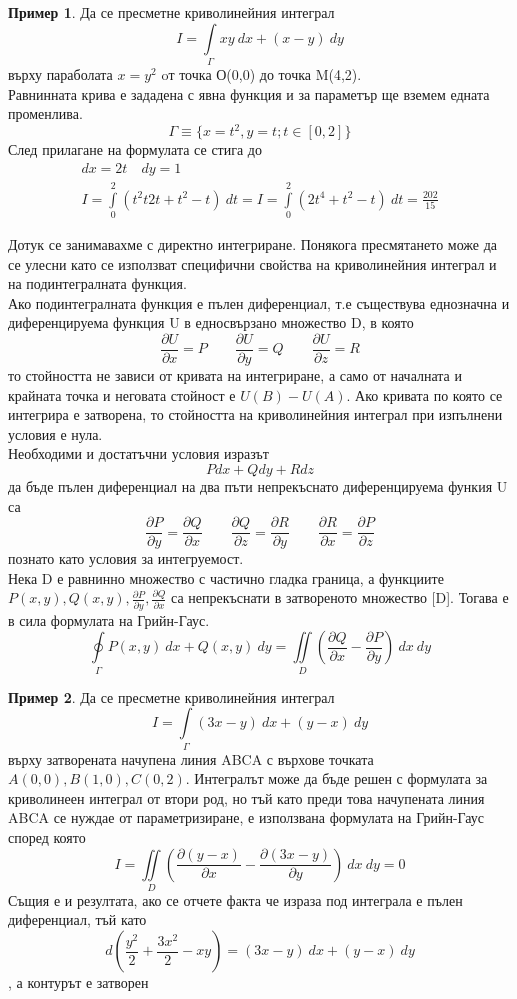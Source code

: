 \documentclass[a4paper,fleqn,12pt]{article}
\theoremstyle{definition}
\newtheorem{example}{Пример}[subsection]
\begin{document}
\begin{example}
Да се пресметне криволинейния интеграл 
$$I = \int\limits_{\Gamma} xy \ dx + (x-y) \ dy$$
върху параболата $x = y^2$ oт точка О(0,0) до точка M(4,2). \\
Равнинната крива е зададена с явна функция и за параметър ще вземем едната променлива. 
$$\Gamma \equiv \{ x = t^2, y=t; t \in [0,2]\}$$
След прилагане на формулата се стига до 
\begin{gather*}
dx = 2t \quad dy = 1\\
I = \int\limits_0 ^2 \left(t^2 t 2t + t^2 - t \right) \ dt = I = \int\limits_0 ^2 \left(2t^4 + t^2 - t \right) \ dt = \frac{202}{15}
\end{gather*}
\end{example}
Дотук се занимавахме с директно интегриране. 
Понякога пресмятането може да се улесни като се използват специфични свойства на криволинейния интеграл и на подинтегралната функция. \\
Ако подинтегралната функция е пълен диференциал, т.е съществува еднозначна и диференцируема функция U в едносвързано множество D, в която 
$$\frac{\partial U}{\partial x} = P \qquad \frac{\partial U}{\partial y} = Q \qquad \frac{\partial U}{\partial z} = R $$
то стойността не зависи от кривата на интегриране, а само от началната и крайната точка и неговата стойност е $U(B) - U(A)$.
Ако кривата по която се интегрира е затворена, то стойността на криволинейния интеграл при изпълнени условия е нула. \\
Необходими и достатъчни условия изразът
$$P dx + Q dy + R dz$$
да бъде пълен диференциал на два пъти непрекъснато диференцируема функия U са
$$\frac{\partial P}{\partial y} = \frac{\partial Q}{\partial x} \qquad 
\frac{\partial Q}{\partial z} = \frac{\partial R}{\partial y} \qquad 
\frac{\partial R}{\partial x} = \frac{\partial P}{\partial z}$$
познато като условия за интегруемост. \\
Нека D е равнинно множество с частично гладка граница, а функциите $P(x,y), Q(x,y), \frac{\partial P}{\partial y}, \frac{\partial Q}{\partial x}$ са непрекъснати в затвореното множество [D]. 
Тогава е в сила формулата на Грийн-Гаус.
$$\oint\limits_{\Gamma} P(x,y) \ dx + Q (x,y) \ dy = 
\iint\limits_{D} \left( \frac{\partial Q}{\partial x} - \frac{\partial P}{\partial y}\right) \ dx \ dy$$

\begin{example}
Да се пресметне криволинейния интеграл
$$I = \int\limits_{\Gamma} (3x- y) \ dx + (y-x) \ dy$$
върху затворената начупена линия ABCA с върхове точката $A(0,0), B(1,0), C(0,2)$. 
Интегралът може да бъде решен с формулата за криволинеен интеграл от втори род, но тъй като преди това начупената линия ABCA се нуждае от параметризиране, е използвана формулата на Грийн-Гаус според която 
$$I = \iint\limits_{D}  \left( \frac{\partial (y-x)}{\partial x} - \frac{\partial (3x-y)}{\partial y}\right) \ dx \ dy = 0$$
Същия е и резултата, ако се отчете факта че израза под интеграла е пълен диференциал, тъй като
$$d \left(\frac{y^2}{2} + \frac{3x^2}{2} - xy\right) = (3x- y) \ dx + (y-x) \ dy$$, 
а контурът е затворен 
\end{example}
\end{document}

